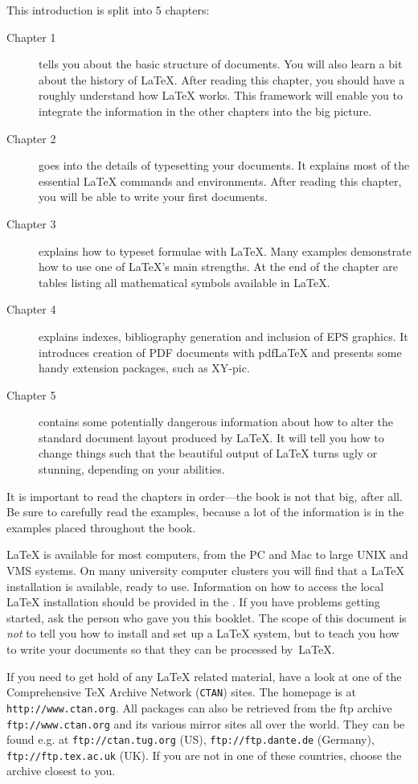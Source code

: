 \bigskip
\noindent This introduction is split into 5 chapters:
\begin{description}
\item[Chapter 1] tells you about the basic structure of \LaTeXe{}
  documents. You will also learn a bit about the history of \LaTeX{}.
  After reading this chapter, you should have a roughly understand how
  \LaTeX{} works. This framework will enable
  you to integrate the information in the other chapters into
  the big picture.
\item[Chapter 2] goes into the details of typesetting your
  documents. It explains most of the essential \LaTeX{} commands and
  environments. After reading this chapter, you will be able to write
  your first documents. 
\item[Chapter 3] explains how to typeset formulae with \LaTeX. Many
  examples demonstrate how to use one of \LaTeX{}'s
  main strengths. At the end of the chapter are tables listing
  all mathematical symbols available in \LaTeX{}.
\item[Chapter 4] explains indexes,  bibliography generation and
  inclusion of EPS graphics. It introduces creation of PDF documents with pdf\LaTeX{}
  and presents some handy extension packages, such as XY-pic.
\item[Chapter 5] contains some potentially dangerous information about
  how to alter the
  standard document layout produced by \LaTeX{}. It will tell you how  to
  change things such that the beautiful output of \LaTeX{}
  turns ugly or stunning, depending on your abilities.
\end{description}
\bigskip
\noindent It is important to read the chapters in order---the book is
not that big, after all. Be sure to carefully read the examples,
because a lot of the information is in the
examples placed throughout the book.

\bigskip
\noindent \LaTeX{} is available for most computers, from the PC and Mac to large
UNIX and VMS systems. On many university computer clusters you will
find that a \LaTeX{} installation is available, ready to use.
Information on how to access
the local \LaTeX{} installation should be provided in the \guide. If
you have problems getting started, ask the person who gave you this
booklet. The scope of this document is \emph{not} to tell you how to
install and set up a \LaTeX{} system, but to teach you how to write
your documents so that they can be processed by~\LaTeX{}.

\bigskip
\noindent If you need to get hold of any \LaTeX{} related material, 
have a look at one of the Comprehensive \TeX{} Archive Network
(\texttt{CTAN}) sites. The homepage is at
\texttt{http://www.ctan.org}. All packages can also be retrieved from
the ftp archive \texttt{ftp://www.ctan.org} and its various mirror
sites all over the world.  They can be found e.g.{} at
\texttt{ftp://ctan.tug.org} (US), \texttt{ftp://ftp.dante.de}
(Germany), \texttt{ftp://ftp.tex.ac.uk} (UK).  If you are not in one
of these countries, choose the archive closest to you.

